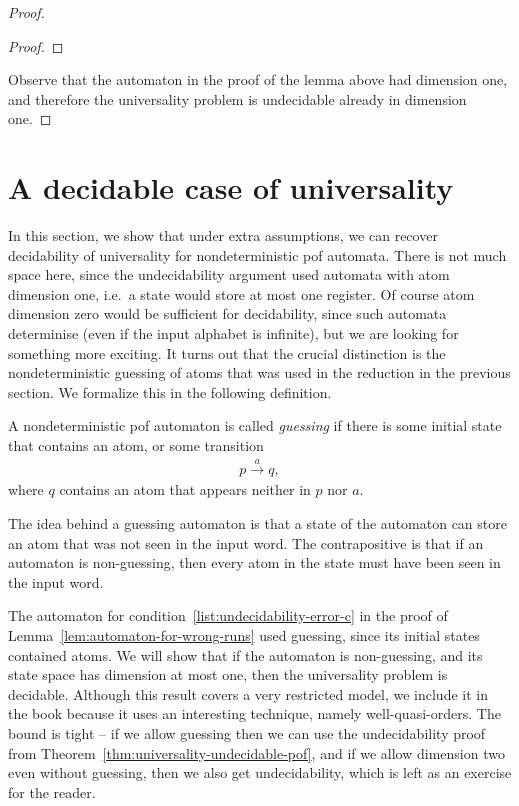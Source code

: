 \begin{proof}
\begin{proof}
\end{proof}

Observe that the automaton in the proof of the lemma above had dimension one, and therefore the universality problem is undecidable already in dimension one.
\end{proof}

\exercisepart


\section{A decidable case of universality}
\label{sec:decidable-universality}
In this section, we show that under extra assumptions, we can recover decidability of  universality for nondeterministic pof automata. There is not much space here, since the undecidability argument used automata with atom dimension one, i.e.~a state would store at most one register. Of course atom dimension zero would be sufficient for decidability, since such automata determinise (even if the input alphabet is infinite), but we are looking for something more exciting. It turns out that the  crucial distinction is the  nondeterministic guessing of atoms that was used in the reduction in the previous section. We formalize this in the following definition. 

\begin{definition}
    A nondeterministic pof automaton is called \emph{guessing} if there is some initial state that contains an atom, or some transition 
    \begin{align*}
    p \stackrel a \to q,
    \end{align*}
    where $q$ contains an atom that appears neither in $p$ nor $a$. 
\end{definition}

The idea behind a guessing automaton is that a state of the automaton can store an atom that was not seen in the input word. The contrapositive is that  if an automaton is non-guessing, then every atom in the state must have been seen in the input word. 

The automaton for condition~\ref{list:undecidability-error-c} in the proof of Lemma~\ref{lem:automaton-for-wrong-runs} used guessing, since its initial states contained atoms. 
We will  show that if the automaton is non-guessing, and its state space has dimension at most one, then the universality problem is decidable. Although this result covers a very restricted model, we include it in the book because it uses an interesting technique, namely well-quasi-orders. 
The bound is tight -- if we allow guessing then we can use the undecidability proof from Theorem~\ref{thm:universality-undecidable-pof}, and if we allow dimension two even without guessing, then we also get undecidability, which is left as an exercise for the reader. 

